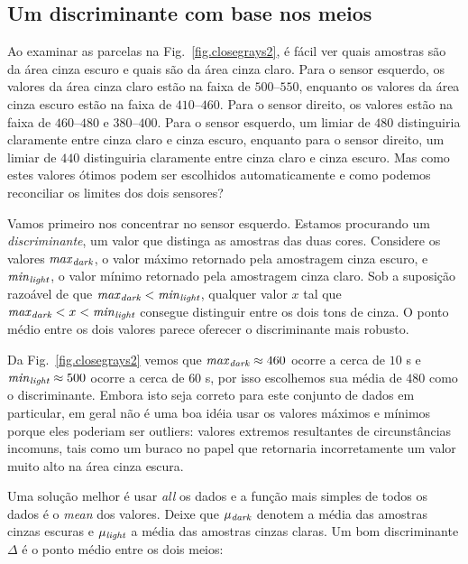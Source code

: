\subsection{Um discriminante com base nos meios}

Ao examinar as parcelas na Fig.~\ref{fig.closegrays2}, é fácil ver quais amostras são da área cinza escuro e quais são da área cinza claro. Para o sensor esquerdo, os valores da área cinza claro estão na faixa de $500$--$550$, enquanto os valores da área cinza escuro estão na faixa de $410$--$460$. Para o sensor direito, os valores estão na faixa de $460$--$480$ e $380$--$400$. Para o sensor esquerdo, um limiar de $480$ distinguiria claramente entre cinza claro e cinza escuro, enquanto para o sensor direito, um limiar de $440$ distinguiria claramente entre cinza claro e cinza escuro. Mas como estes valores ótimos podem ser escolhidos automaticamente e como podemos reconciliar os limites dos dois sensores?

Vamos primeiro nos concentrar no sensor esquerdo. Estamos procurando um \emph{discriminante}, um valor que distinga as amostras das duas cores. Considere os valores $\mathit{max}_{\textit{\scriptsize dark}}$, o valor máximo retornado pela amostragem cinza escuro, e $\mathit{min}_{\textit{\scriptsize light}}$, o valor mínimo retornado pela amostragem cinza claro. Sob a suposição razoável de que  $\mathit{max}_{\textit{\scriptsize dark}} <\mathit{min}_{\textit{\scriptsize light}}$, qualquer valor $x$ tal que $\mathit{max}_{\textit{\scriptsize dark}} < x <\mathit{min}_{\textit{\scriptsize light}}$ consegue distinguir entre os dois tons de cinza. O ponto médio entre os dois valores parece oferecer o discriminante mais robusto.

Da Fig.~\ref{fig.closegrays2} vemos que $\mathit{max}_{\textit{\scriptsize dark}}\approx 460$ ocorre a cerca de $10$ s e $\mathit{min}_{\textit{\scriptsize light}}\approx 500$ ocorre a cerca de $60$ s, por isso escolhemos sua média de $480$ como o discriminante. Embora isto seja correto para este conjunto de dados em particular, em geral não é uma boa idéia usar os valores máximos e mínimos porque eles poderiam ser {outliers}: valores extremos resultantes de circunstâncias incomuns, tais como um buraco no papel que retornaria incorretamente um valor muito alto na área cinza escura.

Uma solução melhor é usar \emph{all} os dados e a função mais simples de todos os dados é o \emph{mean} dos valores. Deixe que $\mu_{\textit{\scriptsize dark}}$ denotem a média das amostras cinzas escuras e $\mu_{\textit{\scriptsize light}}$ a média das amostras cinzas claras. Um bom discriminante $\Delta$ é o ponto médio entre os dois meios:

